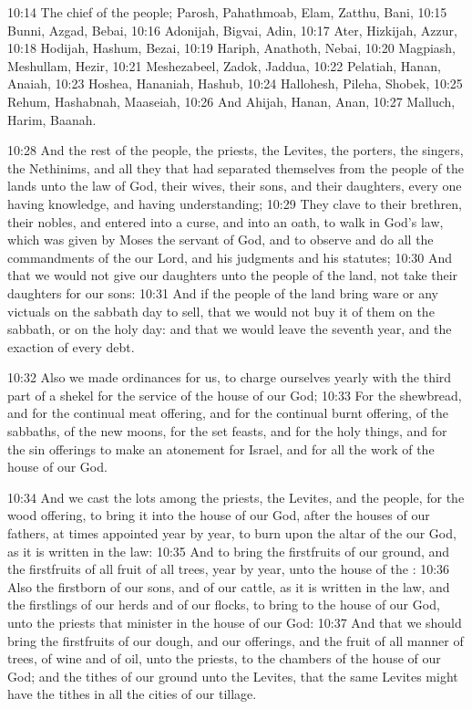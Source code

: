 10:14 The chief of the people; Parosh, Pahathmoab, Elam, Zatthu, Bani, 10:15 Bunni, Azgad, Bebai, 10:16 Adonijah, Bigvai, Adin, 10:17 Ater, Hizkijah, Azzur, 10:18 Hodijah, Hashum, Bezai, 10:19 Hariph, Anathoth, Nebai, 10:20 Magpiash, Meshullam, Hezir, 10:21 Meshezabeel, Zadok, Jaddua, 10:22 Pelatiah, Hanan, Anaiah, 10:23 Hoshea, Hananiah, Hashub, 10:24 Hallohesh, Pileha, Shobek, 10:25 Rehum, Hashabnah, Maaseiah, 10:26 And Ahijah, Hanan, Anan, 10:27 Malluch, Harim, Baanah.

10:28 And the rest of the people, the priests, the Levites, the porters, the singers, the Nethinims, and all they that had separated themselves from the people of the lands unto the law of God, their wives, their sons, and their daughters, every one having knowledge, and having understanding; 10:29 They clave to their brethren, their nobles, and entered into a curse, and into an oath, to walk in God's law, which was given by Moses the servant of God, and to observe and do all the commandments of the \LORD our Lord, and his judgments and his statutes; 10:30 And that we would not give our daughters unto the people of the land, not take their daughters for our sons: 10:31 And if the people of the land bring ware or any victuals on the sabbath day to sell, that we would not buy it of them on the sabbath, or on the holy day: and that we would leave the seventh year, and the exaction of every debt.

10:32 Also we made ordinances for us, to charge ourselves yearly with the third part of a shekel for the service of the house of our God; 10:33 For the shewbread, and for the continual meat offering, and for the continual burnt offering, of the sabbaths, of the new moons, for the set feasts, and for the holy things, and for the sin offerings to make an atonement for Israel, and for all the work of the house of our God.

10:34 And we cast the lots among the priests, the Levites, and the people, for the wood offering, to bring it into the house of our God, after the houses of our fathers, at times appointed year by year, to burn upon the altar of the \LORD our God, as it is written in the law: 10:35 And to bring the firstfruits of our ground, and the firstfruits of all fruit of all trees, year by year, unto the house of the \LORD: 10:36 Also the firstborn of our sons, and of our cattle, as it is written in the law, and the firstlings of our herds and of our flocks, to bring to the house of our God, unto the priests that minister in the house of our God: 10:37 And that we should bring the firstfruits of our dough, and our offerings, and the fruit of all manner of trees, of wine and of oil, unto the priests, to the chambers of the house of our God; and the tithes of our ground unto the Levites, that the same Levites might have the tithes in all the cities of our tillage.

